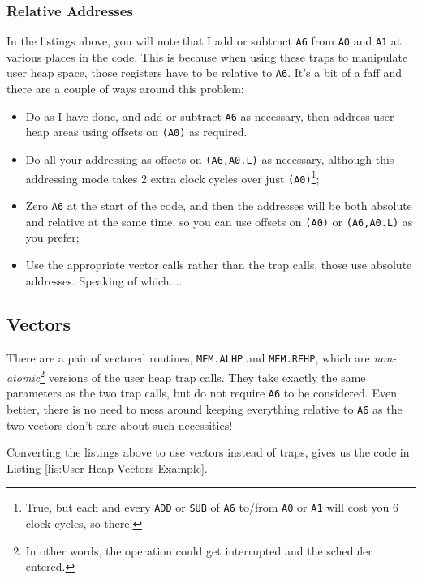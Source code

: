 \subsubsection{Relative Addresses}

In the listings above, you will note that I add or subtract \texttt{A6}
from \texttt{A0} and \texttt{A1} at various places in the code. This
is because when using these traps to manipulate user heap space, those
registers have to be relative to \texttt{A6}. It's a bit of a faff
and there are a couple of ways around this problem:
\begin{itemize}
\item Do as I have done, and add or subtract \texttt{A6} as necessary, then
address user heap areas using offsets on \texttt{(A0)} as required.
\item Do all your addressing as offsets on \texttt{(A6,A0.L)} as necessary,
although this addressing mode takes 2 extra clock cycles over just
\texttt{(A0)}\footnote{True, but each and every \texttt{ADD} or \texttt{SUB} of \texttt{A6}
to/from \texttt{A0} or \texttt{A1} will cost you 6 clock cycles, so
there!};
\item Zero \texttt{A6} at the start of the code, and then the addresses
will be both absolute and relative at the same time, so you can use
offsets on \texttt{(A0)} or \texttt{(A6,A0.L)} as you prefer;
\item Use the appropriate vector calls rather than the trap calls, those
use absolute addresses. Speaking of which....
\end{itemize}

\subsection{Vectors}

There are a pair of vectored routines, \texttt{MEM.ALHP} and \texttt{MEM.REHP},
which are \emph{non-atomic}\footnote{In other words, the operation could get interrupted and the scheduler
entered.} versions of the user heap trap calls. They take exactly the same
parameters as the two trap calls, but do not require \texttt{A6} to
be considered. Even better, there is no need to mess around keeping
everything relative to \texttt{A6} as the two vectors don't care about
such necessities!

Converting the listings above to use vectors instead of traps, gives
us the code in Listing \ref{lis:User-Heap-Vectors-Example}.


